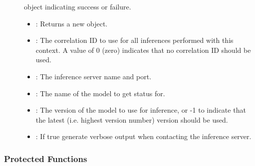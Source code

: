 \documentclass[letterpaper,10pt,english]{sphinxmanual}
\begin{document}
\begin{fulllineitems}
\begin{fulllineitems}
\begin{description}
\item[{}] \leavevmode
{\hyperref[\detokenize{cpp_api/classnvidia_1_1inferenceserver_1_1client_1_1Error:classnvidia_1_1inferenceserver_1_1client_1_1Error}]{}} object indicating success or failure. 

\item[{}] \leavevmode\begin{itemize}
\item {} 
: Returns a new {\hyperref[\detokenize{cpp_api/classnvidia_1_1inferenceserver_1_1client_1_1InferGrpcContext:classnvidia_1_1inferenceserver_1_1client_1_1InferGrpcContext}]{}} object. 

\item {} 
: The correlation ID to use for all inferences performed with this context. A value of 0 (zero) indicates that no correlation ID should be used. 

\item {} 
: The inference server name and port. 

\item {} 
: The name of the model to get status for. 

\item {} 
: The version of the model to use for inference, or -1 to indicate that the latest (i.e. highest version number) version should be used. 

\item {} 
: If true generate verbose output when contacting the inference server. 

\end{itemize}

\end{description}


\end{fulllineitems}

\subsubsection*{Protected Functions}


\end{fulllineitems}
\end{document}
